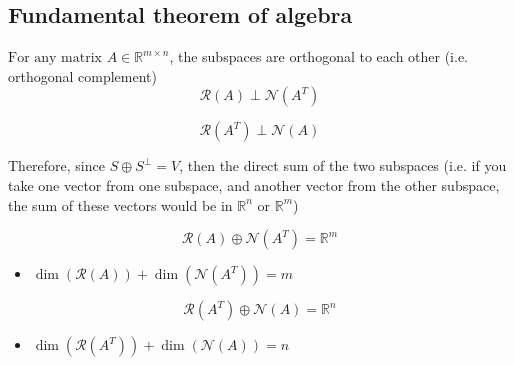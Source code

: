 \subsection{Fundamental theorem of algebra}
\begin{definition}
    $\text{For any matrix } A \in \mathbb{R}^{m \times n}$, the subspaces are orthogonal to each other (i.e. orthogonal complement)
    \begin{equation}
        \mathcal{R}(A) \perp \mathcal{N}(A^T)
    \end{equation}

    \begin{equation}
    \mathcal{R}(A^T) \perp \mathcal{N}(A)
    \end{equation}

    Therefore, since $S \oplus S^\perp = V$, then the direct sum of the two subspaces (i.e. if you take one vector from one subspace, and another vector from the other subspace, the sum of these vectors would be in $\mathbb{R}^n$ or $\mathbb{R}^m$)

    \begin{equation}
    \mathcal{R}(A) \oplus \mathcal{N}(A^T) = \mathbb{R}^m
    \end{equation}
    \begin{itemize}
        \item $\dim(\mathcal{R}(A)) + \dim(\mathcal{N}(A^T)) = m$
    \end{itemize}

    \begin{equation}
    \mathcal{R}(A^T) \oplus \mathcal{N}(A) = \mathbb{R}^n
    \end{equation}
    \begin{itemize}
        \item $\dim(\mathcal{R}(A^T)) + \dim(\mathcal{N}(A)) = n$
    \end{itemize}
\end{definition}

